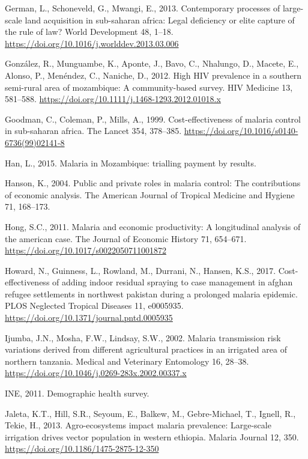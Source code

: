 \documentclass[]{article}
\begin{document}
\hypertarget{ref-German2013}{}
German, L., Schoneveld, G., Mwangi, E., 2013. Contemporary processes of
large-scale land acquisition in sub-saharan africa: Legal deficiency or
elite capture of the rule of law? World Development 48, 1--18.
\url{https://doi.org/10.1016/j.worlddev.2013.03.006}

\hypertarget{ref-Gonzlez2012}{}
González, R., Munguambe, K., Aponte, J., Bavo, C., Nhalungo, D., Macete,
E., Alonso, P., Menéndez, C., Naniche, D., 2012. High HIV prevalence in
a southern semi-rural area of mozambique: A community-based survey. HIV
Medicine 13, 581--588.
\url{https://doi.org/10.1111/j.1468-1293.2012.01018.x}

\hypertarget{ref-Goodman1999}{}
Goodman, C., Coleman, P., Mills, A., 1999. Cost-effectiveness of malaria
control in sub-saharan africa. The Lancet 354, 378--385.
\url{https://doi.org/10.1016/s0140-6736(99)02141-8}

\hypertarget{ref-Han}{}
Han, L., 2015. Malaria in Mozambique: trialling payment by results.

\hypertarget{ref-Hanson2004}{}
Hanson, K., 2004. Public and private roles in malaria control: The
contributions of economic analysis. The American Journal of Tropical
Medicine and Hygiene 71, 168--173.

\hypertarget{ref-Hong2011}{}
Hong, S.C., 2011. Malaria and economic productivity: A longitudinal
analysis of the american case. The Journal of Economic History 71,
654--671. \url{https://doi.org/10.1017/s0022050711001872}

\hypertarget{ref-Howard_2017}{}
Howard, N., Guinness, L., Rowland, M., Durrani, N., Hansen, K.S., 2017.
Cost-effectiveness of adding indoor residual spraying to case management
in afghan refugee settlements in northwest pakistan during a prolonged
malaria epidemic. PLOS Neglected Tropical Diseases 11, e0005935.
\url{https://doi.org/10.1371/journal.pntd.0005935}

\hypertarget{ref-Ijumba2002}{}
Ijumba, J.N., Mosha, F.W., Lindsay, S.W., 2002. Malaria transmission
risk variations derived from different agricultural practices in an
irrigated area of northern tanzania. Medical and Veterinary Entomology
16, 28--38. \url{https://doi.org/10.1046/j.0269-283x.2002.00337.x}

\hypertarget{ref-estatistica2009}{}
INE, 2011. Demographic health survey.

\hypertarget{ref-Jaleta2013}{}
Jaleta, K.T., Hill, S.R., Seyoum, E., Balkew, M., Gebre-Michael, T.,
Ignell, R., Tekie, H., 2013. Agro-ecosystems impact malaria prevalence:
Large-scale irrigation drives vector population in western ethiopia.
Malaria Journal 12, 350. \url{https://doi.org/10.1186/1475-2875-12-350}
\end{document}
